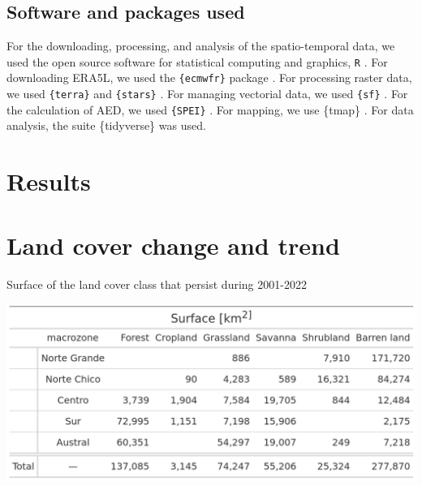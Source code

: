 \documentclass[
  authoryear,
  preprint,
  3p,
  onecolumn]{elsarticle}
\begin{document}
\hypertarget{software-and-packages-used}{%
\subsection{Software and packages
used}\label{software-and-packages-used}}

For the downloading, processing, and analysis of the spatio-temporal
data, we used the open source software for statistical computing and
graphics, \texttt{R} \citep{R2023}. For downloading ERA5L, we used the
\texttt{\{ecmwfr\}} package \citep{Hufkens2019}. For processing raster
data, we used \texttt{\{terra\}} \citep{Hijmans2023} and
\texttt{\{stars\}} \citep{Pebesma2023}. For managing vectorial data, we
used \texttt{\{sf\}} \citep{Pebesma2018}. For the calculation of AED, we
used \texttt{\{SPEI\}} \citep{Bergueria2023}. For mapping, we use
\{tmap\} \citep{Tennekes2018}. For data analysis, the suite
\{tidyverse\} \citep{Wickham2019} was used.

\hypertarget{results}{%
\section{Results}\label{results}}

\hypertarget{land-cover-change-and-trend-1}{%
\section{Land cover change and
trend}\label{land-cover-change-and-trend-1}}

\begin{table}[!ht]
\caption{Surface of the land cover class that persist during 2001-2022}
\label{tab-landcoverSurf}
\includegraphics[width = .5\textwidth]{../output/figs/table_surface_landcover_macrozone.png}
\end{table}
\end{document}
